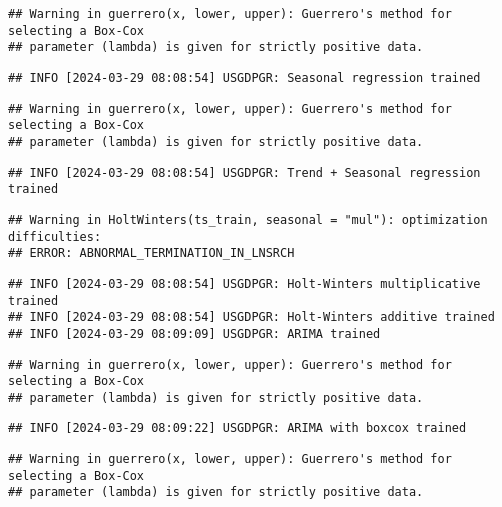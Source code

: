 \documentclass[
]{article}
\begin{document}
\begin{verbatim}
## Warning in guerrero(x, lower, upper): Guerrero's method for selecting a Box-Cox
## parameter (lambda) is given for strictly positive data.
\end{verbatim}

\begin{verbatim}
## INFO [2024-03-29 08:08:54] USGDPGR: Seasonal regression trained
\end{verbatim}

\begin{verbatim}
## Warning in guerrero(x, lower, upper): Guerrero's method for selecting a Box-Cox
## parameter (lambda) is given for strictly positive data.
\end{verbatim}

\begin{verbatim}
## INFO [2024-03-29 08:08:54] USGDPGR: Trend + Seasonal regression trained
\end{verbatim}

\begin{verbatim}
## Warning in HoltWinters(ts_train, seasonal = "mul"): optimization difficulties:
## ERROR: ABNORMAL_TERMINATION_IN_LNSRCH
\end{verbatim}

\begin{verbatim}
## INFO [2024-03-29 08:08:54] USGDPGR: Holt-Winters multiplicative trained
## INFO [2024-03-29 08:08:54] USGDPGR: Holt-Winters additive trained
## INFO [2024-03-29 08:09:09] USGDPGR: ARIMA trained
\end{verbatim}

\begin{verbatim}
## Warning in guerrero(x, lower, upper): Guerrero's method for selecting a Box-Cox
## parameter (lambda) is given for strictly positive data.
\end{verbatim}

\begin{verbatim}
## INFO [2024-03-29 08:09:22] USGDPGR: ARIMA with boxcox trained
\end{verbatim}

\begin{verbatim}
## Warning in guerrero(x, lower, upper): Guerrero's method for selecting a Box-Cox
## parameter (lambda) is given for strictly positive data.
\end{verbatim}
\end{document}
